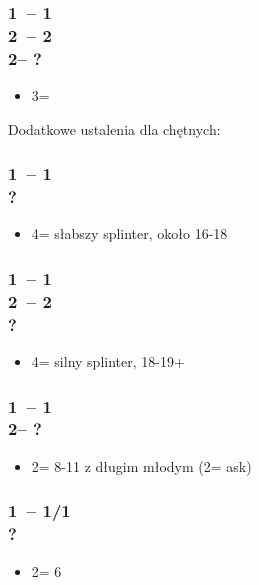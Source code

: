 \documentclass[12pt, a4paper]{article}
\begin{document}
\subsubsection*{1\major\ -- 1\ntx\ \\ 
                2\clubs\ -- 2\major \\ 
                2\nt -- ?}
\begin{itemize}
    \item 3\major = \nf
\end{itemize}

\newpage
Dodatkowe ustalenia dla chętnych:

\subsubsection*{1\hearts\ -- 1\spades\ \\ ?}
\begin{itemize}
    \item 4\minor = słabszy splinter, około 16-18
\end{itemize}

\subsubsection*{1\hearts\ -- 1\spades\ \\ 
                2\clubs\ -- 2\diams\ \\ ?}
\begin{itemize}
    \item 4\minor = silny splinter, 18-19+
\end{itemize}

\subsubsection*{1\hearts\ -- 1\nt\ \\ 2\clubs -- ?}
\begin{itemize}
    \item 2\spades = 8-11 z długim młodym (2\nt = ask)
\end{itemize}

\subsubsection*{1\hearts\ -- 1\spades/1\ntx\ \\ ?}
\begin{itemize}
    \item 2\nt = 6\minor \gf
\end{itemize}
\end{document}
